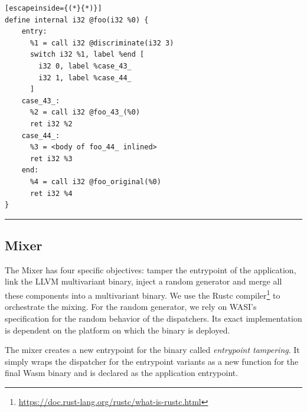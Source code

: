 \lstset{
    language=llvm,
    basicstyle=\footnotesize\ttfamily,
    columns=fullflexible,
    breaklines=true,
    numbers=none,
    stepnumber=1,
    float
}

\begin{code}
\scriptsize
\noindent\begin{minipage}[b]{\linewidth}
    \begin{minipage}[t]{1\linewidth}
        \begin{lstlisting}[escapeinside={(*}{*)}]
define internal i32 @foo(i32 %0) {
    entry:
      %1 = call i32 @discriminate(i32 3)
      switch i32 %1, label %end [
        i32 0, label %case_43_
        i32 1, label %case_44_
      ]
    case_43_:                 
      %2 = call i32 @foo_43_(%0)
      ret i32 %2
    case_44_:                
      %3 = <body of foo_44_ inlined>
      ret i32 %3
    end:                                             
      %4 = call i32 @foo_original(%0)
      ret i32 %4
}
        \end{lstlisting}
    \end{minipage}%
    
    \noindent\rule{\linewidth}{0.4pt}
    \label{listing:multivariant_template}
\end{minipage}
\end{code}

\subsection*{Mixer}

The Mixer has four specific objectives: tamper the entrypoint of the application, link the LLVM multivariant binary, inject a random generator and merge all these components into a multivariant \wasm binary.
We use the Rustc compiler\footnote{\url{https://doc.rust-lang.org/rustc/what-is-rustc.html}} to orchestrate the mixing.
For the random generator, we rely on WASI's specification \cite{WASI} for the random behavior of the dispatchers. Its exact implementation is dependent on the platform on which the binary is deployed.

The \tool mixer creates a new entrypoint for the binary called \emph{entrypoint tampering}.
It simply wraps the dispatcher for the entrypoint variants as a new function for the final Wasm  binary and is declared as the application entrypoint. %

